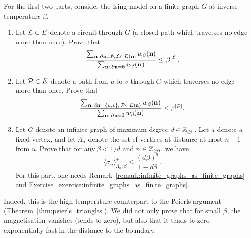 \begin{exercise}
    \label{exercise:currents_peierls}
    For the first two parts, consider
    the Ising model on a finite graph $G$ at inverse temperature $\beta$.
    \begin{enumerate}
        \item Let $\mathcal L\subset E$ denote a circuit through $G$
        (a closed path which traverses no edge more than once).
        Prove that
        \[
            \frac{
                \sum_{\mathbf{n}:\:\partial\mathbf{n}=\emptyset,\,\mathcal L\subset E(\mathbf{n})} w_\beta(\mathbf{n})
            }{
                \sum_{\mathbf{n}:\:\partial\mathbf{n}=\emptyset} w_\beta(\mathbf{n})
            }
            \leq
            \beta^{|\mathcal L|}.
        \]
        \item Let $\mathcal P\subset E$ denote a path from $u$ to $v$ through $G$
        which traverses no edge more than once.
        Prove that
        \[
            \frac{
                \sum_{\mathbf{n}:\:\partial\mathbf{n}=\{u,v\},\,\mathcal P\subset E(\mathbf{n})} w_\beta(\mathbf{n})
            }{
                \sum_{\mathbf{n}:\:\partial\mathbf{n}=\emptyset} w_\beta(\mathbf{n})
            }
            \leq
            \beta^{|\mathcal P|}.
        \]
        \item Let $G$ denote an infinite graph of maximum degree $d\in\mathbb Z_{\geq 0}$.
        Let $u$ denote a fixed vertex, and let $\Lambda_n$ denote the set of vertices
        at distance at most $n-1$ from $u$.
        Prove that for any $\beta<1/d$ and $n\in\mathbb Z_{\geq 0}$, we have
        \[
            \langle\sigma_u\rangle_{\Lambda_n,\beta}^+
            \leq
            \frac{(d\beta)^n}{1-d\beta}.
        \]
        For this part, one needs Remark~\ref{remark:infinite_graphs_as_finite_graphs}
        and Exercise~\ref{exercise:infinite_graphs_as_finite_graphs}.
    \end{enumerate}
    Indeed, this is the high-temperature counterpart to the Peierls argument
    (Theorem~\ref{thm:peierls_triangles}).
    We did not only prove that for small $\beta$, the magnetisation vanishes
    (tends to zero),
    but also that it tends to zero exponentially fast in the distance to the boundary.
\end{exercise}

